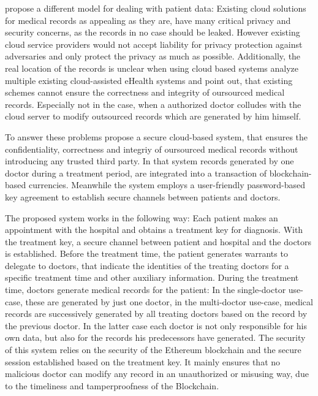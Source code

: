 \citeauthor{Cao2019} propose a different model for dealing with patient data:
Existing cloud solutions for medical records as appealing as they are, have many critical privacy and security concerns, as the records in no case should be leaked. However existing cloud service providers would not accept liability for privacy protection against adversaries and only protect the privacy as much as possible. Additionally, the real location of the records is unclear when using cloud based systems 
\citeauthor{Cao2019} analyze multiple existing cloud-assisted eHealth systems and point out, that existing schemes cannot ensure the correctness and integrity of oursourced medical records. Especially not in the case, when a authorized doctor colludes with the cloud server to modify outsourced records which are generated by him himself.

To answer these problems \citeauthor{Cao2019} propose a secure cloud-based system, that ensures the confidentiality, correctness and integriy of oursourced medical records without introducing any trusted third party. In that system records generated by one doctor during a treatment period, are integrated into a transaction of blockchain-based currencies. Meanwhile the system employs a user-friendly password-based key agreement to establish secure channels between patients and doctors.

The proposed system works in the following way: Each patient makes an appointment with the hospital and obtains a treatment key for diagnosis. With the treatment key, a secure channel between patient and hospital and the doctors is established. 
Before the treatment time, the patient generates warrants to delegate to doctors, that indicate the identities of the treating doctors for a specific treatment time and other auxiliary information.
During the treatment time, doctors generate medical records for the patient: In the single-doctor use-case, these are generated by just one doctor, in the multi-doctor use-case, medical records are successively generated by all treating doctors based on the record by the previous doctor. In the latter case each doctor is not only responsible for his own data, but also for the records his predecessors have generated.
The security of this system relies on the security of the Ethereum blockchain and the secure session established based on the treatment key. It mainly ensures that no malicious doctor can modify any record in an unauthorized or misusing way, due to the timeliness and tamperproofness of the Blockchain.

